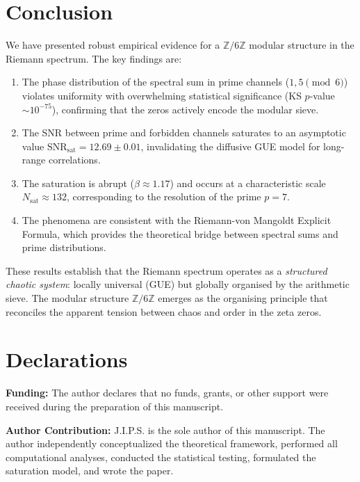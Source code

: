 \documentclass[12pt,a4paper]{article}
\theoremstyle{plain}
\theoremstyle{definition}
\theoremstyle{remark}
\begin{document}
\section{Conclusion}
\label{sec:conclusion}

We have presented robust empirical evidence for a \(\mathbb{Z}/6\mathbb{Z}\) modular structure in the Riemann spectrum. The key findings are:
\begin{enumerate}[label=(\arabic*)]
    \item The phase distribution of the spectral sum in prime channels (\(1,5 \pmod{6}\)) violates uniformity with overwhelming statistical significance (KS \(p\)-value \(\sim 10^{-75}\)), confirming that the zeros actively encode the modular sieve.
    \item The SNR between prime and forbidden channels saturates to an asymptotic value \(\mathrm{SNR}_{\mathrm{sat}} = 12.69 \pm 0.01\), invalidating the diffusive GUE model for long-range correlations.
    \item The saturation is abrupt (\(\beta \approx 1.17\)) and occurs at a characteristic scale \(N_{\text{sat}} \approx 132\), corresponding to the resolution of the prime \(p=7\).
    \item The phenomena are consistent with the Riemann-von Mangoldt Explicit Formula, which provides the theoretical bridge between spectral sums and prime distributions.
\end{enumerate}

These results establish that the Riemann spectrum operates as a \emph{structured chaotic system}: locally universal (GUE) but globally organised by the arithmetic sieve. The modular structure \(\mathbb{Z}/6\mathbb{Z}\) emerges as the organising principle that reconciles the apparent tension between chaos and order in the zeta zeros.

\section*{Declarations}

\textbf{Funding:} The author declares that no funds, grants, or other support were received during the preparation of this manuscript.

\vspace{0.5em}
\noindent\textbf{Author Contribution:} J.I.P.S. is the sole author of this manuscript. The author independently conceptualized the theoretical framework, performed all computational analyses, conducted the statistical testing, formulated the saturation model, and wrote the paper.
\end{document}
